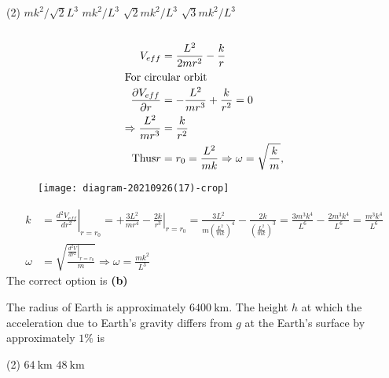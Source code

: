 \begin{enumerate}
\begin{minipage}{\textwidth}
\end{minipage}
\begin{tasks}(2)
	\task[\textbf{A.}] $m k^{2} / \sqrt{2} L^{3}$
	\task[\textbf{B.}]$m k^{2} / L^{3}$
	\task[\textbf{C.}]$\sqrt{2} m k^{2} / L^{3}$
	\task[\textbf{D.}]$\sqrt{3} m k^{2} / L^{3}$
\end{tasks}
\begin{answer}$\left. \right. $\\
	\begin{minipage}{0.5\textwidth}
	\begin{align*}
	V_{e f f}&=\frac{L^{2}}{2 m r^{2}}-\frac{k}{r} \\
	\intertext{For circular orbit} \frac{\partial V_{e f f}}{\partial r}&=-\frac{L^{2}}{m r^{3}}+\frac{k}{r^{2}}=0 \\
	\Rightarrow \frac{L^{2}}{m r^{3}}&=\frac{k}{r^{2}} \\
	\text{Thus} r&=r_{0}=\frac{L^{2}}{m k} \Rightarrow \omega=\sqrt{\frac{k}{m}},
	\end{align*}
	\end{minipage}
\begin{minipage}{0.5\textwidth}
\begin{figure}[H]
	\centering
	\texttt{[image: diagram-20210926(17)-crop]}
\end{figure}
\end{minipage}
 \begin{align*}
 k&=\left.\frac{d^{2} V_{e f f}}{d r^{2}}\right|_{r=r_{0}}=+\frac{3 L^{2}}{m r^{4}}-\left.\frac{2 k}{r^{3}}\right|_{r=r_{0}}=\frac{3 L^{2}}{m\left(\frac{L^{2}}{m k}\right)^{4}}-\frac{2 k}{\left(\frac{L^{2}}{m k}\right)^{3}}=\frac{3 m^{3} k^{4}}{L^{6}}-\frac{2 m^{3} k^{4}}{L^{6}}=\frac{m^{3} k^{4}}{L^{6}}\\
 \omega&=\sqrt{\frac{\left.\frac{d^{2} V}{d r^{2}}\right|_{r=r_{0}}}{m}} \Rightarrow \omega=\frac{m k^{2}}{L^{3}}
 \end{align*}
 The correct option is \textbf{(b)}	
\end{answer}
\begin{minipage}{\textwidth}
\item The radius of Earth is approximately $6400 \mathrm{~km}$. The height $h$ at which the acceleration due to Earth's gravity differs from $g$ at the Earth's surface by approximately $1 \%$ is
\end{minipage}
\begin{tasks}(2)
	\task[\textbf{A.}] $64 \mathrm{~km}$
	\task[\textbf{B.}] $48 \mathrm{~km}$

\end{tasks}
\end{enumerate}
